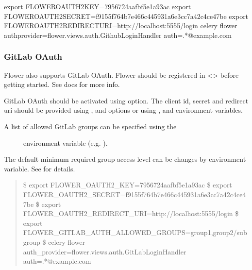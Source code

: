 \documentclass[letterpaper,10pt,english]{sphinxmanual}
\begin{document}
\begin{sphinxVerbatim}[commandchars=\\\{\}]
\PYGZdl{} export FLOWER\PYGZus{}OAUTH2\PYGZus{}KEY=7956724aafbf5e1a93ac
\PYGZdl{} export FLOWER\PYGZus{}OAUTH2\PYGZus{}SECRET=f9155f764b7e466c445931a6e3cc7a42c4ce47be
\PYGZdl{} export FLOWER\PYGZus{}OAUTH2\PYGZus{}REDIRECT\PYGZus{}URI=http://localhost:5555/login
\PYGZdl{} celery flower \PYGZhy{}\PYGZhy{}auth\PYGZus{}provider=flower.views.auth.GithubLoginHandler \PYGZhy{}\PYGZhy{}auth=.*@example\PYGZbs{}.com
\end{sphinxVerbatim}


\subsubsection{GitLab OAuth}
\label{\detokenize{auth:gitlab-oauth}}\label{\detokenize{auth:id3}}
Flower also supports GitLab OAuth. Flower should be registered in
\textless{}\textgreater{} before getting started.
See  docs for more info.

GitLab OAuth should be activated using  option.
The client id, secret and redirect uri should be provided using
,  and  options or using
,  and 
environment variables.
\begin{description}
\item[{A list of allowed GitLab groups can be specified using the}] \leavevmode
{} environment variable (e.g. ).

\end{description}

The default minimum required group access level can be changes by
 environment variable.
See  for details.
\begin{quote}

\$ export FLOWER\_OAUTH2\_KEY=7956724aafbf5e1a93ac
\$ export FLOWER\_OAUTH2\_SECRET=f9155f764b7e466c445931a6e3cc7a42c4ce47be
\$ export FLOWER\_OAUTH2\_REDIRECT\_URI=http://localhost:5555/login
\$ export FLOWER\_GITLAB\_AUTH\_ALLOWED\_GROUPS=group1,group2/subgroup
\$ celery flower \textendash{}auth\_provider=flower.views.auth.GitLabLoginHandler \textendash{}auth=.*@example.com
\end{quote}
\end{document}
